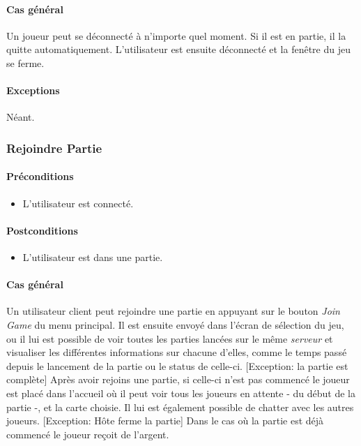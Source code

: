 \documentclass[a4paper,11pt]{report}
\begin{document}
\paragraph{Cas général}
Un joueur peut se déconnecté à n'importe quel moment. Si il est en partie, il la quitte automatiquement. L'utilisateur
est ensuite déconnecté et la fenêtre du jeu se ferme.
\paragraph{Exceptions} Néant.
\subsubsection{Rejoindre Partie}
\paragraph{Préconditions}
\begin{itemize}
 \item L'utilisateur est connecté.
\end{itemize}
\paragraph{Postconditions}
\begin{itemize}
 \item L'utilisateur est dans une partie.
\end{itemize}
\paragraph{Cas général}
Un utilisateur client peut rejoindre une partie en appuyant sur le bouton \og \textit{Join Game} \fg 
du menu principal.
Il est ensuite envoyé dans l'écran de sélection du jeu, ou il lui est possible de voir toutes les parties lancées sur le
même \textit{serveur} et visualiser les différentes informations sur chacune d'elles, comme le temps passé depuis le lancement
de la partie ou le status de celle-ci.
[Exception: la partie est complète]
Après avoir rejoins une partie, si celle-ci n'est pas commencé le joueur est placé dans l’accueil où il peut
voir tous les joueurs en attente - du début de la partie -, et la carte choisie. Il lui
est également possible de chatter avec les autres joueurs. 
[Exception: Hôte ferme la partie]
Dans le cas où la partie est déjà commencé le joueur reçoit de l'argent.
\end{document}
